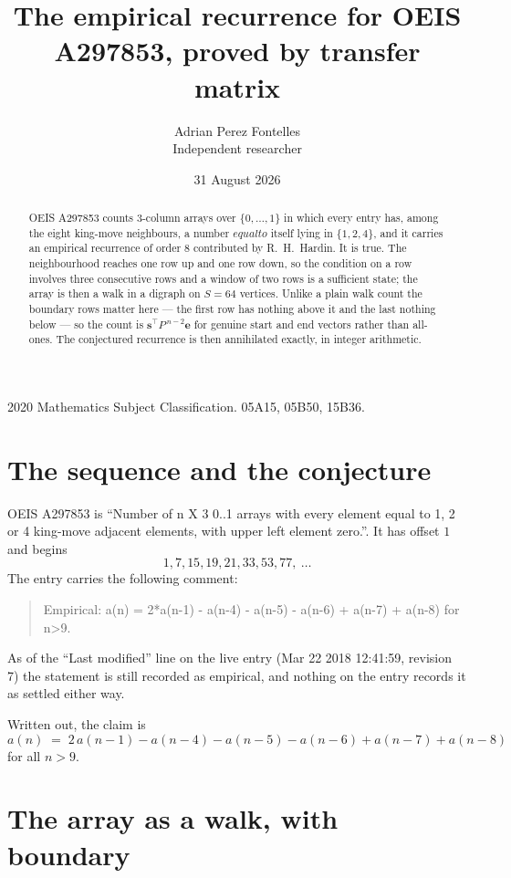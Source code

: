 \documentclass[11pt,a4paper]{article}
\title{The empirical recurrence for OEIS A297853, proved by transfer matrix}
\author{Adrian Perez Fontelles\\ \small Independent researcher}
\date{31 August 2026}
\theoremstyle{plain}
\theoremstyle{definition}
\begin{document}
\maketitle

\begin{abstract}
OEIS A297853 counts $3$-column arrays over $\{0,\dots,1\}$ in which every entry has,
among the eight king-move neighbours, a number $equal to$ itself lying in $\{1,2,4\}$, and it carries an empirical
recurrence of order $8$ contributed by R.~H.~Hardin. It is true. The neighbourhood
reaches one row up and one row down, so the condition on a row involves three consecutive
rows and a window of two rows is a sufficient state; the array is then a walk in a digraph
on $S=64$ vertices. Unlike a plain walk count the boundary rows matter here --- the first
row has nothing above it and the last nothing below --- so the count is
$\mathbf{s}^{\!\top}P^{\,n-2}\mathbf{e}$ for genuine start and end vectors rather than
all-ones. The conjectured recurrence is then annihilated exactly, in integer arithmetic.
\end{abstract}

\noindent\small 2020 Mathematics Subject Classification. 05A15, 05B50, 15B36.\normalsize

\section{The sequence and the conjecture}

OEIS A297853 is ``Number of n X 3 0..1 arrays with every element equal to 1, 2 or 4 king-move adjacent elements, with upper left element zero.''. It has offset
$1$ and begins
\[
1, 7, 15, 19, 21, 33, 53, 77,\ \dots
\]
The entry carries the following comment:
\begin{quote}\small
Empirical: a(n) = 2*a(n-1) - a(n-4) - a(n-5) - a(n-6) + a(n-7) + a(n-8) for n>9.
\end{quote}
As of the ``Last modified'' line on the live entry (Mar 22 2018 12:41:59, revision
7) the statement is still recorded as empirical, and nothing on the entry
records it as settled either way.

Written out, the claim is
\begin{equation}\label{eq:conj}
a(n)\;=\;2\,a(n-1) - a(n-4) - a(n-5) - a(n-6) + a(n-7) + a(n-8)
\end{equation}
for all $n>9$.

\section{The array as a walk, with boundary}
\end{document}
